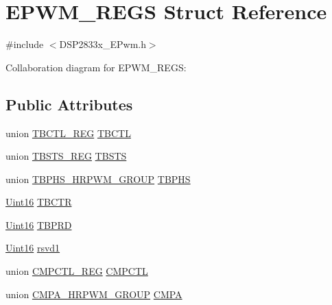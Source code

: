 \hypertarget{struct_e_p_w_m___r_e_g_s}{}\section{E\+P\+W\+M\+\_\+\+R\+E\+G\+S Struct Reference}
\label{struct_e_p_w_m___r_e_g_s}


{\ttfamily \#include $<$D\+S\+P2833x\+\_\+\+E\+Pwm.\+h$>$}



Collaboration diagram for E\+P\+W\+M\+\_\+\+R\+E\+G\+S\+:
\subsection*{Public Attributes}
\begin{DoxyCompactItemize}
\item 
union \hyperlink{union_t_b_c_t_l___r_e_g}{T\+B\+C\+T\+L\+\_\+\+R\+E\+G} \hyperlink{struct_e_p_w_m___r_e_g_s_ae1617d7e6a6b13c684b36758bc4d60c0}{T\+B\+C\+T\+L}
\item 
union \hyperlink{union_t_b_s_t_s___r_e_g}{T\+B\+S\+T\+S\+\_\+\+R\+E\+G} \hyperlink{struct_e_p_w_m___r_e_g_s_ae8e31651fc7f00f129c5c53a6579b7a5}{T\+B\+S\+T\+S}
\item 
union \hyperlink{union_t_b_p_h_s___h_r_p_w_m___g_r_o_u_p}{T\+B\+P\+H\+S\+\_\+\+H\+R\+P\+W\+M\+\_\+\+G\+R\+O\+U\+P} \hyperlink{struct_e_p_w_m___r_e_g_s_a7aac82cf7a9320e1e1ee626a16d9f5b3}{T\+B\+P\+H\+S}
\item 
\hyperlink{_d_s_p2833x___device_8h_a59a9f6be4562c327cbfb4f7e8e18f08b}{Uint16} \hyperlink{struct_e_p_w_m___r_e_g_s_a0f0867569ad15a9158e341ab918fa6cf}{T\+B\+C\+T\+R}
\item 
\hyperlink{_d_s_p2833x___device_8h_a59a9f6be4562c327cbfb4f7e8e18f08b}{Uint16} \hyperlink{struct_e_p_w_m___r_e_g_s_a6bfe710b9824c6ccf9925344a1db2709}{T\+B\+P\+R\+D}
\item 
\hyperlink{_d_s_p2833x___device_8h_a59a9f6be4562c327cbfb4f7e8e18f08b}{Uint16} \hyperlink{struct_e_p_w_m___r_e_g_s_afe8dbd49d283c65b9c85e3ed091b85b8}{rsvd1}
\item 
union \hyperlink{union_c_m_p_c_t_l___r_e_g}{C\+M\+P\+C\+T\+L\+\_\+\+R\+E\+G} \hyperlink{struct_e_p_w_m___r_e_g_s_a87596e57661f549e579285df591cc2fa}{C\+M\+P\+C\+T\+L}
\item 
union \hyperlink{union_c_m_p_a___h_r_p_w_m___g_r_o_u_p}{C\+M\+P\+A\+\_\+\+H\+R\+P\+W\+M\+\_\+\+G\+R\+O\+U\+P} \hyperlink{struct_e_p_w_m___r_e_g_s_adc0debd7084d4bf8955c18c0453a589e}{C\+M\+P\+A}

\end{DoxyCompactItemize}
